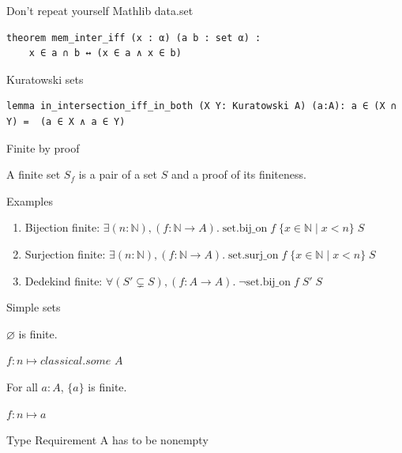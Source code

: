 \documentclass{beamer}
\begin{document}
    \begin{frame}[fragile]{Don't repeat yourself}
        Mathlib data.set
        \begin{lstlisting}
theorem mem_inter_iff (x : α) (a b : set α) :
    x ∈ a ∩ b ↔ (x ∈ a ∧ x ∈ b)
        \end{lstlisting}
        Kuratowski sets
        \begin{lstlisting}
lemma in_intersection_iff_in_both (X Y: Kuratowski A) (a:A): a ∈ (X ∩ Y) =  (a ∈ X ∧ a ∈ Y)
        \end{lstlisting}

    \end{frame}
    \begin{frame}{Finite by proof}
        \begin{definition}
            A finite set $S_f$ is a pair of a set $S$ and a proof of its finiteness.
        \end{definition}
        \pause
        Examples
        \begin{enumerate}
            \item Bijection finite: $\exists (n:\mathbb{N}), (f: \mathbb{N} \to A).\; \text{{set.bij\_on}}\; f \;\{ x \in \mathbb{N} \mid x < n\} \;S$
            \item Surjection finite: $\exists (n:\mathbb{N}), (f: \mathbb{N} \to A).\; \text{{set.surj\_on}}\; f \;\{ x \in \mathbb{N} \mid x < n\} \;S $
            \item Dedekind finite: $\forall (S' \subsetneq S), (f: A \to A).\; \neg \text{{set.bij\_on}}\; f\; S'\; S$
        \end{enumerate}
    \end{frame}
    \begin{frame}[fragile]{Simple sets}
        \begin{lemma}
            $ \varnothing $ is finite.
        \end{lemma}
        $f: n \mapsto classical.some$ $A$
        \begin{lemma}
            For all $a:A$, $\{ a\}$ is finite.
        \end{lemma}
        $f: n \mapsto a$
        \begin{block}{Type Requirement}
        A has to be nonempty
        \end{block}
    \end{frame}
\end{document}
